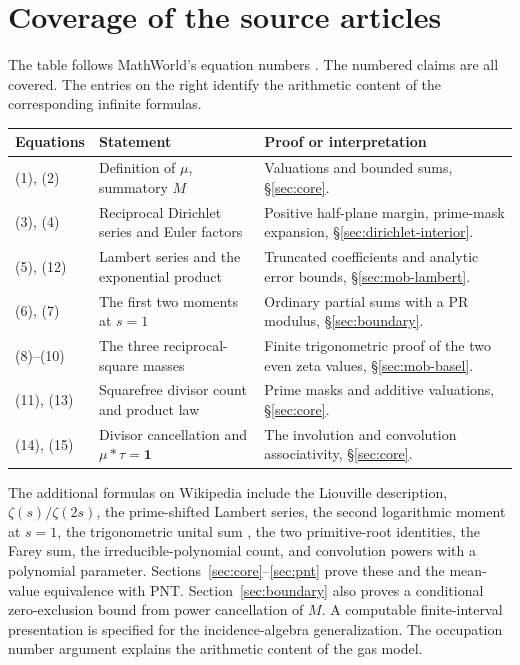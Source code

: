 \section{Coverage of the source articles}\label{sec:coverage}
The table follows MathWorld's equation numbers \cite{mw}. The numbered
claims are all covered. The entries on the right identify the arithmetic
content of the corresponding infinite formulas.

\begin{center}\small
\begin{tabular}{@{}p{.13\linewidth}p{.40\linewidth}p{.40\linewidth}@{}}
\toprule
Equations & Statement & Proof or interpretation\\\midrule
(1), (2) & Definition of $\mu$, summatory $M$ &
Valuations and bounded sums, \S\ref{sec:core}.\\
(3), (4) & Reciprocal Dirichlet series and Euler factors &
Positive half-plane margin, prime-mask expansion, \S\ref{sec:dirichlet-interior}.\\
(5), (12) & Lambert series and the exponential product &
Truncated coefficients and analytic error bounds, \S\ref{sec:mob-lambert}.\\
(6), (7) & The first two moments at $s=1$ &
Ordinary partial sums with a PR modulus, \S\ref{sec:boundary}.\\
(8)--(10) & The three reciprocal-square masses &
Finite trigonometric proof of the two even zeta values, \S\ref{sec:mob-basel}.\\
(11), (13) & Squarefree divisor count and product law &
Prime masks and additive valuations, \S\ref{sec:core}.\\
(14), (15) & Divisor cancellation and $\mu*\tau=\mathbf1$ &
The involution and convolution associativity, \S\ref{sec:core}.\\
\bottomrule
\end{tabular}
\end{center}

The additional formulas on Wikipedia \cite{wiki} include the Liouville
description, $\zeta(s)/\zeta(2s)$, the prime-shifted Lambert series,
the second logarithmic moment at $s=1$, the trigonometric unital sum
\cite{kline}, the two primitive-root identities, the Farey sum, the
irreducible-polynomial count, and convolution powers with a polynomial
parameter. Sections~\ref{sec:core}--\ref{sec:pnt} prove these and the
mean-value equivalence with PNT. Section~\ref{sec:boundary} also proves a conditional zero-exclusion bound from power cancellation of $M$. A computable finite-interval presentation
is specified for the incidence-algebra generalization. The occupation
number argument explains the arithmetic content of the gas model.

